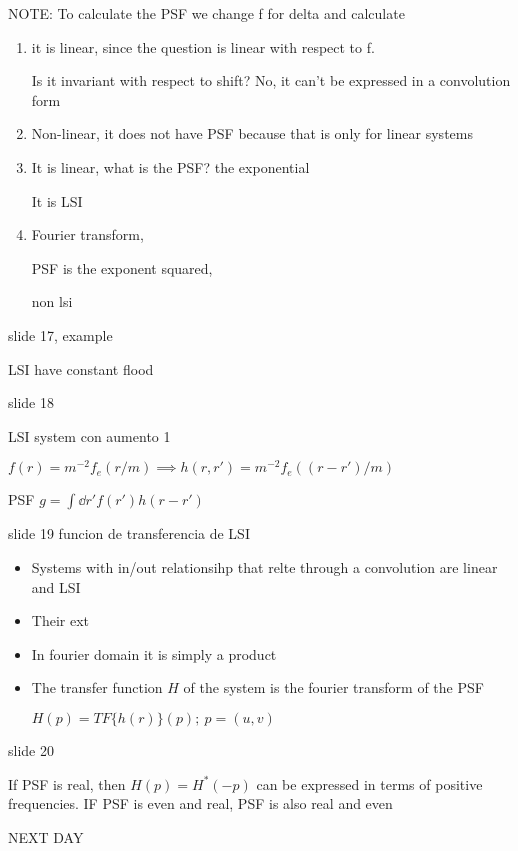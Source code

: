 \documentclass[../main/main.tex]{subfiles}
\begin{document}
NOTE: To calculate the PSF we change f for delta and calculate
\begin{enumerate}
	\item it is linear, since the question is linear with respect to f.

	      Is it invariant with respect to shift? No, it can't be expressed in a convolution form

	\item Non-linear, it does not have PSF because that is only for linear systems

	\item It is linear, what is the PSF? the exponential

	      It is LSI

	\item Fourier transform,

	      PSF is the exponent squared,

	      non lsi

\end{enumerate}

slide 17, example

LSI have constant flood


slide 18

LSI system con aumento 1



$f(r) = m^{-2}f_{e}(r/m) \implies h(r, r') = m^{-2}f_{e}((r-r')/m) $


PSF $g = \int \dd{r'} f(r') h(r-r')$


slide 19 funcion de transferencia de LSI


\begin{itemize}
	\item Systems with in/out relationsihp that relte through a convolution are linear and LSI
	\item Their ext
	\item In fourier domain it is simply a product
	\item The transfer function $H$ of the system is the fourier transform of the PSF

	      $H(p) = TF\{h(r)\}(p);\ p=(u,v)$

\end{itemize}


slide 20

If PSF is real, then $H(p) = H^{*}(-p)$ can be expressed in terms of positive frequencies. IF PSF is even and real, PSF is also real and even


NEXT DAY
\end{document}
